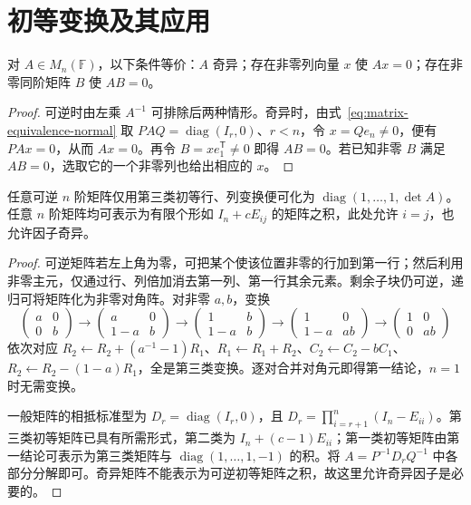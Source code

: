\section{初等变换及其应用}
\label{sec:matrix-elementary-applications}

\begin{proposition}
\label{prop:matrix-singular-witness}
对 $A\in M_n(\mathbb F)$，以下条件等价：$A$ 奇异；存在非零列向量 $x$ 使 $Ax=0$；存在非零同阶矩阵 $B$ 使 $AB=0$。
\end{proposition}
\begin{proof}
可逆时由左乘 $A^{-1}$ 可排除后两种情形。奇异时，由式~\eqref{eq:matrix-equivalence-normal} 取 $PAQ=\operatorname{diag}(I_r,0)$、$r<n$，令 $x=Qe_n\ne0$，便有 $PAx=0$，从而 $Ax=0$。再令 $B=xe_1^{\mathsf T}\ne0$ 即得 $AB=0$。若已知非零 $B$ 满足 $AB=0$，选取它的一个非零列也给出相应的 $x$。
\end{proof}

\begin{proposition}
\label{prop:matrix-transvection-reduction}
任意可逆 $n$ 阶矩阵仅用第三类初等行、列变换便可化为 $\operatorname{diag}(1,\ldots,1,\det A)$。任意 $n$ 阶矩阵均可表示为有限个形如 $I_n+cE_{ij}$ 的矩阵之积，此处允许 $i=j$，也允许因子奇异。
\end{proposition}
\begin{proof}
可逆矩阵若左上角为零，可把某个使该位置非零的行加到第一行；然后利用非零主元，仅通过行、列倍加消去第一列、第一行其余元素。剩余子块仍可逆，递归可将矩阵化为非零对角阵。对非零 $a,b$，变换
\[
 \begin{pmatrix}a&0\\0&b\end{pmatrix}
 \longrightarrow\begin{pmatrix}a&0\\1-a&b\end{pmatrix}
 \longrightarrow\begin{pmatrix}1&b\\1-a&b\end{pmatrix}
 \longrightarrow\begin{pmatrix}1&0\\1-a&ab\end{pmatrix}
 \longrightarrow\begin{pmatrix}1&0\\0&ab\end{pmatrix}
\]
依次对应 $R_2\gets R_2+(a^{-1}-1)R_1$、$R_1\gets R_1+R_2$、$C_2\gets C_2-bC_1$、$R_2\gets R_2-(1-a)R_1$，全是第三类变换。逐对合并对角元即得第一结论，$n=1$ 时无需变换。

一般矩阵的相抵标准型为 $D_r=\operatorname{diag}(I_r,0)$，且 $D_r=\prod_{i=r+1}^n(I_n-E_{ii})$。第三类初等矩阵已具有所需形式，第二类为 $I_n+(c-1)E_{ii}$；第一类初等矩阵由第一结论可表示为第三类矩阵与 $\operatorname{diag}(1,\ldots,1,-1)$ 的积。将 $A=P^{-1}D_rQ^{-1}$ 中各部分分解即可。奇异矩阵不能表示为可逆初等矩阵之积，故这里允许奇异因子是必要的。
\end{proof}

